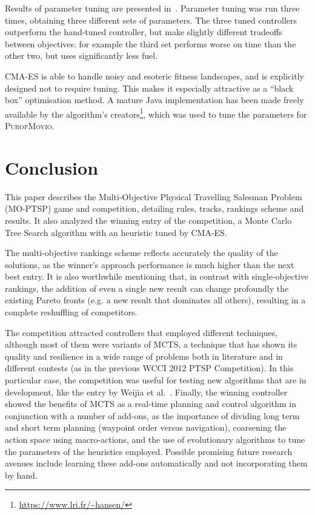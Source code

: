 \documentclass[conference]{IEEEtran}
\begin{document}
Results of parameter tuning are presented in~\cite{Powley2013_moptsp}.
Parameter tuning was run three times, obtaining three different sets of parameters.
The three tuned controllers outperform the hand-tuned controller,
but make slightly different tradeoffs between objectives:
for example the third set performs worse on time than the other two, but uses significantly less fuel.

CMA-ES is able to handle noisy and esoteric fitness landscapes, and is explicitly designed not to require tuning.
This makes it especially attractive as a ``black box'' optimisation method.
A mature Java implementation has been made freely available by the algorithm's creators\footnote{\url{https://www.lri.fr/~hansen/}},
which was used to tune the parameters for \textsc{PurofMovio}.

\section{Conclusion} \label{sec:conc}

This paper describes the Multi-Objective Physical Travelling Salesman Problem (MO-PTSP) game and competition, detailing rules, tracks, rankings scheme and results. It also analyzed the winning entry of the competition, a Monte Carlo Tree Search algorithm with an heuristic tuned by CMA-ES.  

The multi-objective rankings scheme reflects accurately the quality of the solutions, as the winner's approach performance is much higher than the next best entry. It is also worthwhile mentioning that, in contrast with single-objective rankings, the addition of even a single new result can change profoundly the existing Pareto fronts (e.g. a new result that dominates all others), resulting in a complete reshuffling of competitors.

The competition attracted controllers that employed different techniques, although most of them were variants of MCTS, a technique that has shown its quality and resilience in a wide range of problems both in literature and in different contests (as in the previous WCCI 2012 PTSP Competition). In this particular case, the competition was useful for testing new algorithms that are in development, like the entry by Weijia et al.~\cite{Wang13}. Finally, the winning controller showed the benefits of MCTS as a real-time planning and control algorithm in conjunction with a number of add-ons, as the importance of dividing long term and short term planning (waypoint order versus navigation), coarsening the action space using macro-actions, and the use of evolutionary algorithms to tune the parameters of the heuristics employed. Possible promising future research avenues include learning these add-ons automatically and not incorporating them by hand. 




\end{document}
